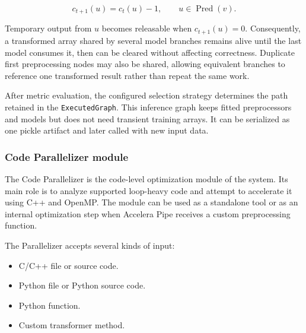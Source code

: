 \documentclass[12pt,a4paper]{report}
\begin{document}
\begin{equation}
c_{t+1}(u)=c_t(u)-1, \qquad u\in\operatorname{Pred}(v).
\end{equation}

Temporary output from $u$ becomes releasable when $c_{t+1}(u)=0$. Consequently,
a transformed array shared by several model branches remains alive until the
last model consumes it, then can be cleared without affecting correctness.
Duplicate first preprocessing nodes may also be shared, allowing equivalent
branches to reference one transformed result rather than repeat the same work.

After metric evaluation, the configured selection strategy determines the path
retained in the \texttt{ExecutedGraph}. This inference graph keeps fitted
preprocessors and models but does not need transient training arrays. It can be
serialized as one pickle artifact and later called with new input data.


\subsubsection*{Code Parallelizer module}

The Code Parallelizer is the code-level optimization module of the system. Its
main role is to analyze supported loop-heavy code and attempt to accelerate it
using C++ and OpenMP. The module can be used as a standalone tool or as an
internal optimization step when Accelera Pipe receives a custom preprocessing
function.

The Parallelizer accepts several kinds of input:

\begin{itemize}
  \item C/C++ file or source code.
  \item Python file or Python source code.
  \item Python function.
  \item Custom transformer method.
\end{itemize}
\end{document}
